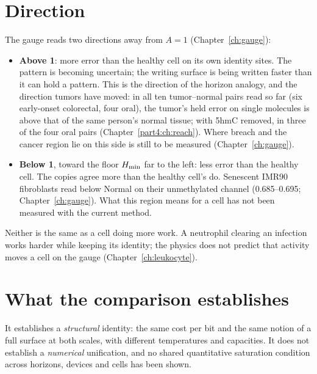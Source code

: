 \section{Direction}

The gauge reads two directions away from $A=1$ (Chapter~\ref{ch:gauge}):
\begin{itemize}
\item \textbf{Above 1}: more error than the healthy cell on its own identity sites. The pattern is becoming uncertain; the
      writing surface is being written faster than it can hold a pattern. This is the direction of the horizon analogy, and the direction tumors have moved: in all ten tumor--normal pairs read so far (six early-onset colorectal, four oral), the tumor's held error on
      single molecules is above that of the same person's normal tissue; with 5hmC removed, in three of the four oral pairs
      (Chapter~\ref{part4:ch:reach}). \measured{} Where breach and the cancer
      region lie on this side is still to be measured (Chapter~\ref{ch:gauge}).
\item \textbf{Below 1}, toward the floor $H_{\min}$ far to the left: less error than the healthy cell. The copies agree more than the healthy
      cell's do. Senescent IMR90 fibroblasts read below Normal on their unmethylated channel (0.685--0.695; Chapter~\ref{ch:gauge}).
      \measured{} What this region means for a cell has not been measured with the current method. \openprob
\end{itemize}
Neither is the same as a cell doing more work. A neutrophil clearing an infection works harder while keeping its identity;
the physics does not predict that activity moves a cell on the gauge (Chapter~\ref{ch:leukocyte}).

\section{What the comparison establishes}

It establishes a \emph{structural} identity: the same cost per bit and the same notion of a full surface at both scales,
with different temperatures and capacities. It does not establish a \emph{numerical} unification, and no shared quantitative
saturation condition across horizons, devices and cells has been shown.
